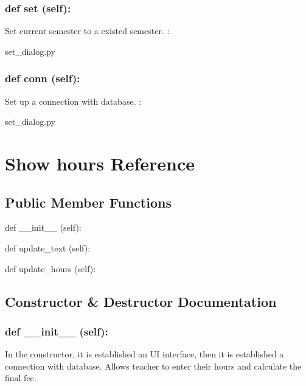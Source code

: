 \hypertarget{class_poly_a14a7ad77ce612b0c54f531d307ee4b39}{
\subsubsection[{def set (self):}]{\setlength{\rightskip}{0pt plus 5cm}def {set} (self):}}\label{class_poly_a14a7ad77ce612b0c54f531d307ee4b39}
Set current semester to a existed semester.
:\begin{DoxyCompactItemize}
\item 
set\_dialog.\-py\end{DoxyCompactItemize}

\hypertarget{class_poly_a14a7ad77ce612b0c54f531d307ee4b39}{
\subsubsection[{def conn (self):}]{\setlength{\rightskip}{0pt plus 5cm}def {conn} (self):}}\label{class_poly_a14a7ad77ce612b0c54f531d307ee4b39}
Set up a connection with database.
:\begin{DoxyCompactItemize}
\item 
set\_dialog.\-py\end{DoxyCompactItemize}

\hypertarget{Show_hours}{\section{Show hours Reference}
\label{Show_hours}
}
\subsection*{Public Member Functions}
\begin{DoxyCompactItemize}
\item 
def {\_\_init\_\_} (self):
\item 
def {update\_text} (self):
\item 
def {update\_hours} (self):

\end{DoxyCompactItemize}

\subsection{Constructor \& Destructor Documentation}
\hypertarget{class_poly_aa3def076b74bed67904976ad4f9fe9b1}{
\subsubsection[{def __init__ (self):}]{\setlength{\rightskip}{0pt plus 5cm}def {\_\_init\_\_} (self): 
}}
In the constructor, it is established an UI interface, then it is  established a connection with database. Allows teacher to enter their hours and calculate the final fee.
 

